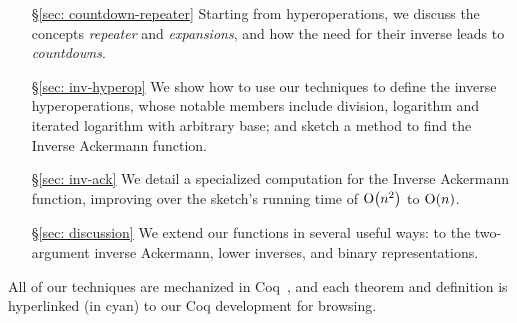 {\color{magenta}
\begin{itemize}
	\item[\S\ref{sec: countdown-repeater}] Starting from hyperoperations, we discuss the concepts \emph{repeater} and \emph{expansions}, and how the need for their inverse leads to \emph{countdowns}.
	\item[\S\ref{sec: inv-hyperop}] We show how to use our techniques to define the inverse hyperoperations, whose notable members include division, logarithm and iterated logarithm with arbitrary base; and sketch a method to find the Inverse Ackermann function.
	\item[\S\ref{sec: inv-ack}] We detail a specialized computation for the Inverse Ackermann function, improving over the sketch's running time of $\text{O}\big(n^2\big)$ to $\text{O}(n)$.
	\item[\S\ref{sec: discussion}] We extend our functions in several useful ways: to the two-argument inverse Ackermann, lower inverses, and binary representations.
\end{itemize}}
All of our techniques are mechanized in Coq~\cite{coq}, and 
each theorem and definition is hyperlinked (in {\color{cyan}cyan}) to our Coq development for browsing.

